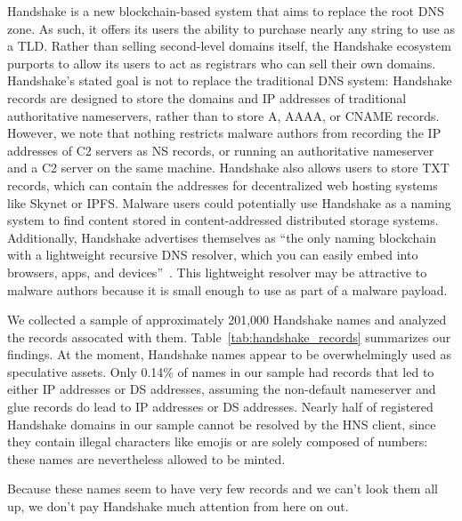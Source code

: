Handshake is a new blockchain-based system that aims to 
replace the root DNS 
zone. As such, it offers its users the ability to purchase 
nearly any string to 
use as a TLD. Rather than selling second-level domains 
itself, the Handshake ecosystem purports to allow its users 
to act as registrars who can sell their own domains. 
Handshake's stated goal is not to replace the traditional DNS 
system: Handshake records are designed to store the domains 
and IP addresses of traditional authoritative nameservers, 
rather than to store A, AAAA, or CNAME records. However, we note that nothing 
restricts malware authors from recording the IP addresses of C2 servers as NS 
records, or running an authoritative nameserver and a C2 server on the same 
machine. Handshake also allows users to store TXT records, which can 
contain the addresses for decentralized web hosting systems 
like Skynet or IPFS. Malware users could potentially use 
Handshake as a naming system to find content stored in 
content-addressed distributed storage systems. Additionally, Handshake 
advertises themselves as ``the only naming blockchain with a lightweight 
recursive DNS resolver, which you can easily embed into 
browsers, apps, and devices''~\cite{namebase_access_handshake}. 
This lightweight resolver may be attractive to malware authors because it is 
small enough to use as part of a malware payload.

We collected a sample of approximately 201,000 Handshake names and analyzed the 
records assocated with them. Table~\ref{tab:handshake_records} 
summarizes our findings. At the moment, Handshake names appear to be 
overwhelmingly used as speculative assets. Only 0.14\% of names in our sample 
had records that led to either IP addresses or DS addresses, assuming the 
non-default nameserver and glue records do lead to IP addresses or DS 
addresses. Nearly half of registered Handshake domains in our sample cannot be 
resolved by the HNS client, since they contain illegal characters like emojis 
or are solely composed of numbers: these names are nevertheless allowed to be 
minted.

Because these names seem to have very few records and we can't look them all 
up, we don't pay Handshake much attention from here on out.